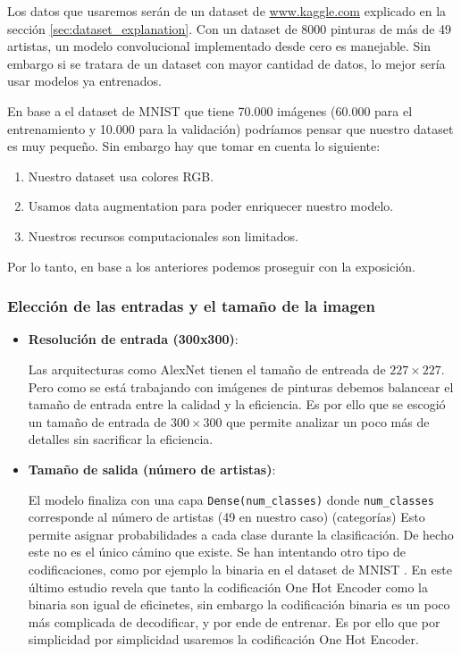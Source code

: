 \documentclass[../main.tex]{subfiles}
\begin{document}
\begin{itemize}
  Los datos que usaremos serán de un dataset de \url{www.kaggle.com} explicado en la sección \ref{sec:dataset_explanation}. Con un dataset de 8000 pinturas de más de 49 artistas, un modelo convolucional implementado desde cero es manejable. Sin embargo si se tratara de un dataset con mayor cantidad de datos, lo mejor sería usar modelos ya entrenados.

  En base a el dataset de MNIST \cite{MNIST} que tiene 70.000 imágenes (60.000 para el entrenamiento y 10.000 para la validación) podríamos pensar que nuestro dataset es muy pequeño. Sin embargo hay que tomar en cuenta lo siguiente:

  \begin{enumerate}
    \item Nuestro dataset usa colores RGB.
    \item Usamos data augmentation para poder enriquecer nuestro modelo.
    \item Nuestros recursos computacionales son limitados.
  \end{enumerate}

Por lo tanto, en base a los anteriores podemos proseguir con la exposición.

\end{itemize}

\subsubsection{Elección de las entradas y el tamaño de la imagen}

\begin{itemize}
  \item \textbf{Resolución de entrada (300x300)}: 
  
  Las arquitecturas como AlexNet \cite{krizhevsky2012imagenet} tienen el tamaño de entreada de \(227 \times 227\). Pero como se está trabajando con imágenes de pinturas debemos balancear el tamaño de entrada entre la calidad y la eficiencia. Es por ello que se escogió un tamaño de entrada de \(300 \times 300\) que permite analizar un poco más de detalles sin sacrificar la eficiencia.

  \item \textbf{Tamaño de salida (número de artistas)}:
  
  El modelo finaliza con una capa \texttt{Dense(num\_classes)} donde \texttt{num\_classes} corresponde al número de artistas (49 en nuestro caso) (categorías) Esto permite asignar probabilidades a cada clase durante la clasificación. De hecho este no es el único cámino que existe. Se han intentando otro tipo de codificaciones, como por ejemplo la binaria en el dataset de MNIST \cite{wei2023binary}. En este último estudio revela que tanto la codificación One Hot Encoder como la binaria son igual de eficinetes, sin embargo la codificación binaria es un poco más complicada de decodificar, y por ende de entrenar. Es por ello que por simplicidad por simplicidad usaremos la codificación One Hot Encoder.

\end{itemize}
\end{document}
